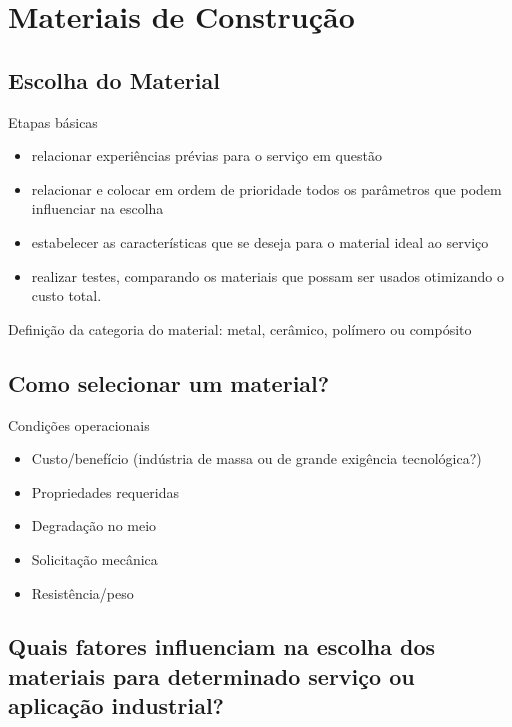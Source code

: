 \section{Materiais de Construção}

\subsection*{Escolha do Material}

Etapas básicas

\begin{itemize}
	
\setlength{\parskip}{0pt}
\setlength{\itemsep}{0pt plus 1pt}

\item relacionar experiências prévias para o serviço em questão
\item relacionar e colocar em ordem de prioridade todos os parâmetros que podem influenciar na escolha
\item estabelecer as características que se deseja para o material ideal ao serviço
\item realizar testes, comparando os materiais que possam ser usados otimizando o custo total.

\end{itemize}

Definição da categoria do material: metal, cerâmico, polímero ou compósito

\subsection*{Como selecionar um material?}

Condições operacionais
\begin{itemize}
	
	\setlength{\parskip}{0pt}
	\setlength{\itemsep}{0pt plus 1pt}
	
\item Custo/benefício (indústria de massa ou de grande exigência tecnológica?)
\item Propriedades requeridas
\item Degradação no meio
\item Solicitação mecânica
\item Resistência/peso
\end{itemize}

\subsection*{Quais fatores influenciam na escolha dos materiais para determinado serviço ou aplicação industrial?}

